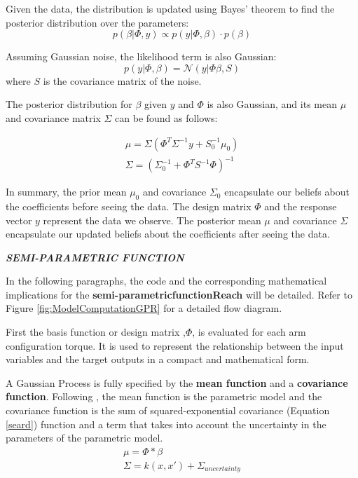 Given the data, the distribution is updated using Bayes' theorem to find the posterior distribution over the parameters:
\begin{equation}
    p(\beta | \Phi, y) \propto p(y | \Phi, \beta) \cdot p(\beta)
\end{equation}

Assuming Gaussian noise, the likelihood term is also Gaussian:
\begin{equation}
  p(y | \Phi, \beta) = \mathcal{N}(y | \Phi \beta, S)
\end{equation}
where \( S \) is the covariance matrix of the noise.

The posterior distribution for \( \beta \) given \( y \) and \( \Phi \) is also Gaussian, and its mean \( \mu \) and covariance matrix \( \Sigma \) can be found as follows:

\begin{equation}
\begin{aligned}
     \mu = \Sigma (\Phi^T \Sigma^{-1} y + S_0^{-1} \mu_0) \\
    \Sigma = \left( \Sigma_0^{-1} + \Phi^T S^{-1} \Phi \right)^{-1}
\end{aligned}
\end{equation}

In summary, the prior mean \( \mu_0 \) and covariance \( \Sigma_0 \) encapsulate our beliefs about the coefficients before seeing the data. The design matrix \( \Phi \) and the response vector \( y \) represent the data we observe. The posterior mean \( \mu \) and covariance \( \Sigma \) encapsulate our updated beliefs about the coefficients after seeing the data.

\textbf{\textit{SEMI-PARAMETRIC FUNCTION}}

In the following paragraphs, the code and the corresponding mathematical implications for the \textbf{semi-parametricfunctionReach} will be detailed.  Refer to Figure \ref{fig:ModelComputationGPR} for a detailed flow diagram.

First the basis function or design matrix ,$\Phi$, is evaluated for each arm configuration torque. It is used to represent the relationship between the input variables and the target outputs in a compact and mathematical form. 

A Gaussian Process is fully specified by the \textbf{mean function} and a \textbf{covariance function}. Following \cite{SPI}, the mean function is the parametric model and the covariance function is the sum of squared-exponential covariance (Equation \ref{seard})  function and a term that takes into account the uncertainty in the parameters of the parametric model. 
\begin{equation}
\begin{aligned}
    \mu = \Phi*\beta \\
    \Sigma = k(x,x')  + \Sigma_{uncertainty}
\end{aligned}
\end{equation}

